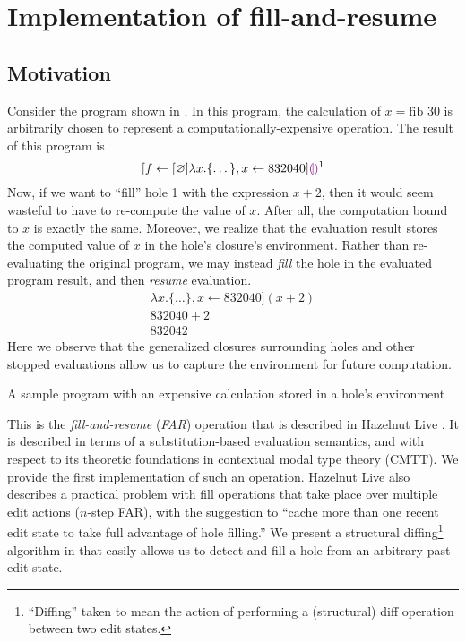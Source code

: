 \chapter{Implementation of fill-and-resume}
\label{sec:far_impl}

\section{Motivation}
\label{sec:far-motivation}

Consider the program shown in . In this program, the calculation of $x=\text{fib }30$ is arbitrarily chosen to represent a computationally-expensive operation. The result of this program is \[
  [f\leftarrow [\varnothing]\lambda x.\{\dots\},x\leftarrow 832040]\textcolor{violet}{\llparenthesis}\textcolor{violet}{\rrparenthesis}^1
\]
Now, if we want to ``fill'' hole 1 with the expression $x+2$, then it would seem wasteful to have to re-compute the value of $x$. After all, the computation bound to $x$ is exactly the same. Moreover, we realize that the evaluation result stores the computed value of $x$ in the hole's closure's environment. Rather than re-evaluating the original program, we may instead \textit{fill} the hole in the evaluated program result, and then \textit{resume} evaluation.
\begin{gather*}
  [f\leftarrow [\varnothing]\lambda x.\{\dots\},x\leftarrow 832040](x+2) \\
  832040+2 \\
  832042
\end{gather*}
Here we observe that the generalized closures surrounding holes and other stopped evaluations allow us to capture the environment for future computation.

\begin{listing}
  \centering
  \caption{A sample program with an expensive calculation stored in a hole's environment}
  \label{fig:far-motivation}
\end{listing}

This is the \textit{fill-and-resume} (\textit{FAR}) operation that is described in Hazelnut Live \cite{conf/popl/HazelnutLive19}. It is described in terms of a substitution-based evaluation semantics, and with respect to its theoretic foundations in contextual modal type theory (CMTT). We provide the first implementation of such an operation. Hazelnut Live also describes a practical problem with fill operations that take place over multiple edit actions ($n$-step FAR), with the suggestion to ``cache more than one recent edit state to take full advantage of hole filling.'' We present a structural diffing\footnote{``Diffing'' taken to mean the action of performing a (structural) diff operation between two edit states.} algorithm in  that easily allows us to detect and fill a hole from an arbitrary past edit state.

